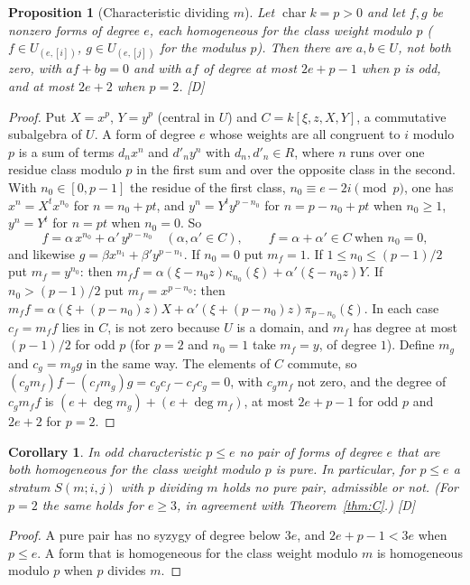 \documentclass[11pt]{article}
\newtheorem{proposition}{Proposition}
\newtheorem{corollary}{Corollary}
\theoremstyle{definition}
\theoremstyle{remark}
\newcommand{\ch}{\operatorname{char}}
\begin{document}
\begin{proposition}[Characteristic dividing $m$]\label{prop:pdivm}
Let $\ch k=p>0$ and let $f,g$ be nonzero forms of degree $e$, each homogeneous for the class weight modulo $p$ ($f\in U_{(e,[i])}$, $g\in U_{(e,[j])}$ for the modulus $p$). Then there are $a,b\in U$, not both zero, with $af+bg=0$ and with $af$ of degree at most $2e+p-1$ when $p$ is odd, and at most $2e+2$ when $p=2$. [D]
\end{proposition}
\begin{proof}
Put $X=x^p$, $Y=y^p$ (central in $U$) and $C=k[\xi,z,X,Y]$, a commutative subalgebra of $U$. A form of degree $e$ whose weights are all congruent to $i$ modulo $p$ is a sum of terms $d_nx^n$ and $d'_ny^n$ with $d_n,d'_n\in R$, where $n$ runs over one residue class modulo $p$ in the first sum and over the opposite class in the second. With $n_0\in[0,p-1]$ the residue of the first class, $n_0\equiv e-2i\pmod p$, one has $x^n=X^tx^{n_0}$ for $n=n_0+pt$, and $y^n=Y^ty^{p-n_0}$ for $n=p-n_0+pt$ when $n_0\ge1$, $y^n=Y^t$ for $n=pt$ when $n_0=0$. So
\[
f=\alpha\,x^{n_0}+\alpha'\,y^{p-n_0}\quad(\alpha,\alpha'\in C),\qquad f=\alpha+\alpha'\in C\ \text{when }n_0=0,
\]
and likewise $g=\beta x^{n_1}+\beta'y^{p-n_1}$. If $n_0=0$ put $m_f=1$. If $1\le n_0\le(p-1)/2$ put $m_f=y^{n_0}$: then $m_ff=\alpha(\xi-n_0z)\kappa_{n_0}(\xi)+\alpha'(\xi-n_0z)Y$. If $n_0>(p-1)/2$ put $m_f=x^{p-n_0}$: then $m_ff=\alpha(\xi+(p-n_0)z)X+\alpha'(\xi+(p-n_0)z)\pi_{p-n_0}(\xi)$. In each case $c_f=m_ff$ lies in $C$, is not zero because $U$ is a domain, and $m_f$ has degree at most $(p-1)/2$ for odd $p$ (for $p=2$ and $n_0=1$ take $m_f=y$, of degree $1$). Define $m_g$ and $c_g=m_gg$ in the same way. The elements of $C$ commute, so $(c_gm_f)f-(c_fm_g)g=c_gc_f-c_fc_g=0$, with $c_gm_f$ not zero, and the degree of $c_gm_ff$ is $(e+\deg m_g)+(e+\deg m_f)$, at most $2e+p-1$ for odd $p$ and $2e+2$ for $p=2$.
\end{proof}

\begin{corollary}\label{cor:pdivm}
In odd characteristic $p\le e$ no pair of forms of degree $e$ that are both homogeneous for the class weight modulo $p$ is pure. In particular, for $p\le e$ a stratum $S(m;i,j)$ with $p$ dividing $m$ holds no pure pair, admissible or not. (For $p=2$ the same holds for $e\ge3$, in agreement with Theorem~\ref{thm:C}.) [D]
\end{corollary}
\begin{proof}
A pure pair has no syzygy of degree below $3e$, and $2e+p-1<3e$ when $p\le e$. A form that is homogeneous for the class weight modulo $m$ is homogeneous modulo $p$ when $p$ divides $m$.
\end{proof}
\end{document}

